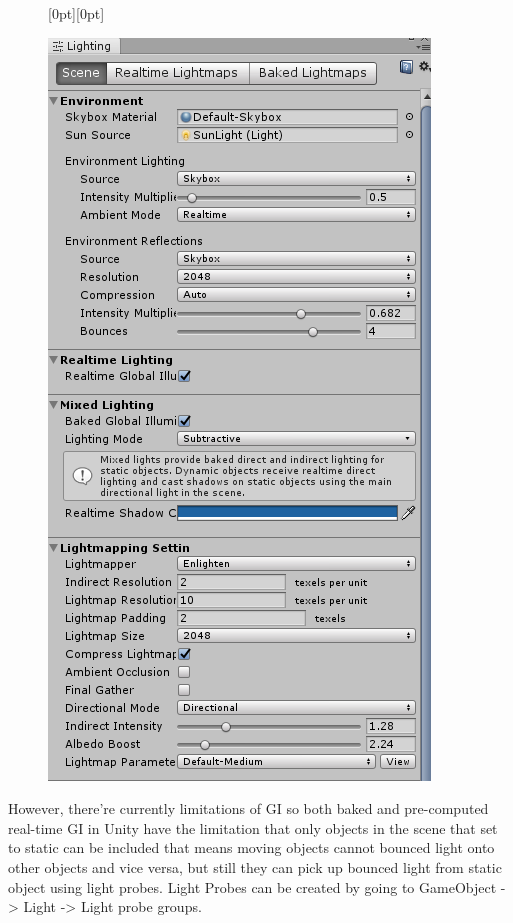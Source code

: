 \documentclass[a4paper, 13pt]{extarticle}
\begin{document}
{ \newpage
 \begin{figure}[h]
 	\raisebox{-50mm}[0pt][0pt]{
 	\begin{minipage}{1\textwidth}
 		\centering
 		\includegraphics[width=0.3\linewidth]{intructions/lighting_setting.png}
 		\centering
 	\end{minipage}
}
 \end{figure}
\vspace{100mm}
 However, there're currently limitations of GI so both baked and pre-computed real-time GI in Unity have the limitation that only objects in the scene that set to static can be included that means moving objects cannot bounced light onto other objects and vice versa, but still they can pick up bounced light from static object using light probes. Light Probes can be created by going to GameObject -> Light -> Light probe groups.
 
}
\end{document}
